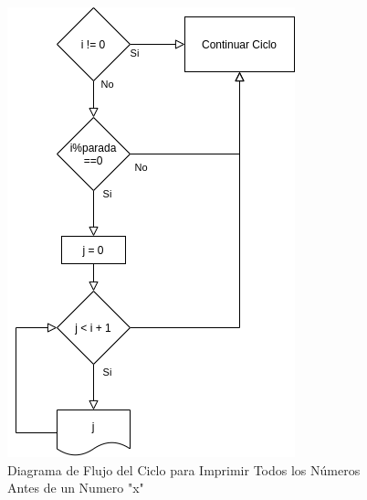 \documentclass[12pt]{article}
\begin{document}
\begin{figure}[H]
    \caption{Diagrama de Flujo del Ciclo para Imprimir Todos los Números Antes de un Numero "x"}
    \centering
    \includegraphics[scale=0.6]{programa3_ciclo2.png}
\end{figure}
\end{document}
